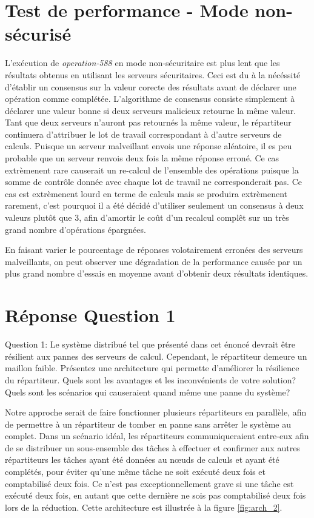 \section{Test de performance - Mode non-sécurisé}

L'exécution de \emph{operation-588} en mode non-sécuritaire est plus lent que les résultats obtenus en utilisant les serveurs sécuritaires. Ceci est du à la nécéssité d'établir un consensus sur la valeur corecte des résultats avant de déclarer une opération comme complétée. L'algorithme de consensus consiste simplement à déclarer une valeur bonne si deux serveurs malicieux retourne la même valeur. Tant que deux serveurs n'auront pas retournés la même valeur, le répartiteur continuera d'attribuer le lot de travail correspondant à d'autre serveurs de calculs. Puisque un serveur malveillant envois une réponse aléatoire, il es peu probable que un serveur renvois deux fois la même réponse erroné. Ce cas extrèmenent rare causerait un re-calcul de l'ensemble des opérations puisque la somme de contrôle donnée avec chaque lot de travail ne corresponderait pas. Ce cas est extrèmenent lourd en terme de calculs mais se produira extrèmenent rarement, c'est pourquoi il a été décidé d'utiliser seulement un consensus à deux valeurs plutôt que 3, afin d'amortir le coût d'un recalcul complêt sur un très grand nombre d'opérations épargnées.

En faisant varier le pourcentage de réponses volotairement erronées des serveurs malveillants, on peut observer une dégradation de la performance causée par un plus grand nombre d'essais en moyenne avant d'obtenir deux résultats identiques. 




\section{Réponse Question 1}
Question 1: Le système distribué tel que présenté dans cet énoncé devrait être résilient aux pannes
des serveurs de calcul. Cependant, le répartiteur demeure un maillon faible. Présentez une
architecture qui permette d'améliorer la résilience du répartiteur. Quels sont les avantages et les
inconvénients de votre solution? Quels sont les scénarios qui causeraient quand même une panne du
système?

Notre approche serait de faire fonctionner plusieurs répartiteurs en parallèle, afin de permettre à 
un répartiteur de tomber en panne sans arrêter le système au complet. Dans un scénario idéal, les répartiteurs 
communiqueraient entre-eux afin de se distribuer un sous-ensemble des tâches à effectuer et confirmer aux autres répartiteurs 
les tâches ayant été données au nœuds de calculs et ayant été complétés, pour éviter qu'une même tâche ne soit exécuté deux fois
et comptabilisé deux fois. Ce n'est pas exceptionnellement grave si une tâche est exécuté deux fois, en autant que cette dernière ne sois 
pas comptabilisé deux fois lors de la réduction. Cette architecture est illustrée à la figure  \ref{fig:arch_2}.

